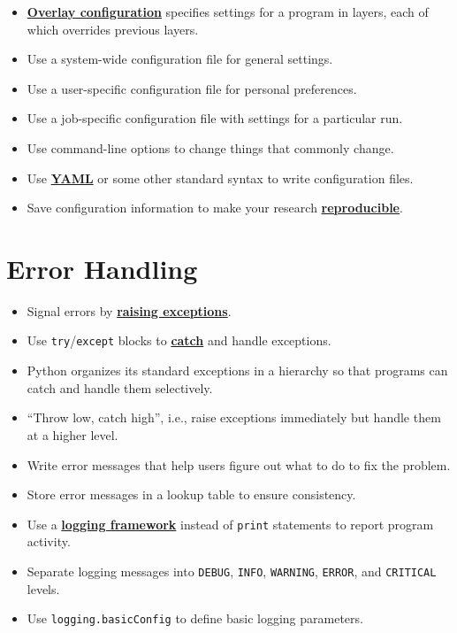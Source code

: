 \documentclass[
]{krantz}
\providecommand{\tightlist}{%
  \setlength{\itemsep}{0pt}\setlength{\parskip}{0pt}}
\newcommand{\gref}[2]{\hyperlink{#2}{\textbf{#1}}}
\begin{document}
\begin{itemize}
\tightlist
\item
  \gref{Overlay configuration}{overlay\_configuration} specifies settings for a program in layers,
  each of which overrides previous layers.
\item
  Use a system-wide configuration file for general settings.
\item
  Use a user-specific configuration file for personal preferences.
\item
  Use a job-specific configuration file with settings for a particular run.
\item
  Use command-line options to change things that commonly change.
\item
  Use \gref{YAML}{yaml} or some other standard syntax to write configuration files.
\item
  Save configuration information to make your research \gref{reproducible}{reproducible\_research}.
\end{itemize}

\hypertarget{error-handling-1}{%
\section{Error Handling}\label{error-handling-1}}

\begin{itemize}
\tightlist
\item
  Signal errors by \gref{raising exceptions}{raise\_exception}.
\item
  Use \texttt{try}/\texttt{except} blocks to \gref{catch}{catch\_exception} and handle exceptions.
\item
  Python organizes its standard exceptions in a hierarchy so that programs can catch and handle them selectively.
\item
  ``Throw low, catch high'', i.e., raise exceptions immediately but handle them at a higher level.
\item
  Write error messages that help users figure out what to do to fix the problem.
\item
  Store error messages in a lookup table to ensure consistency.
\item
  Use a \gref{logging framework}{logging\_framework} instead of \texttt{print} statements to report program activity.
\item
  Separate logging messages into \texttt{DEBUG}, \texttt{INFO}, \texttt{WARNING}, \texttt{ERROR}, and \texttt{CRITICAL} levels.
\item
  Use \texttt{logging.basicConfig} to define basic logging parameters.
\end{itemize}
\end{document}
